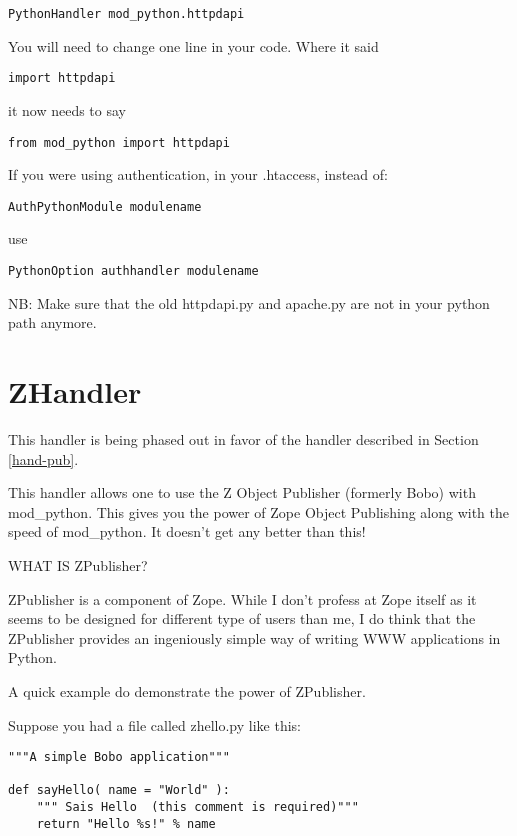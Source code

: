 \begin{verbatim}
PythonHandler mod_python.httpdapi
\end{verbatim}

You will need to change one line in your code. Where it said

\begin{verbatim}
import httpdapi
\end{verbatim}

it now needs to say

\begin{verbatim}
from mod_python import httpdapi
\end{verbatim}    

If you were using authentication, in your .htaccess, instead of:

\begin{verbatim}
AuthPythonModule modulename
\end{verbatim}    

use
\begin{verbatim}
PythonOption authhandler modulename
\end{verbatim}    

NB: Make sure that the old httpdapi.py and apache.py are not in your
python path anymore.

\section{ZHandler\label{hand-z}}

 This handler is being phased out in favor of the
 handler described in 
Section \ref{hand-pub}.

This handler allows one to use the Z Object Publisher (formerly Bobo)
with mod_python. This gives you the power of Zope Object Publishing
along with the speed of mod_python. It doesn't get any better than
this!

WHAT IS ZPublisher?

ZPublisher is a component of Zope. While I don't profess at Zope
itself as it seems to be designed for different type of users than me,
I do think that the ZPublisher provides an ingeniously simple way of
writing WWW applications in Python.

A quick example do demonstrate the power of ZPublisher.

Suppose you had a file called zhello.py like this:

\begin{verbatim}
"""A simple Bobo application"""

def sayHello( name = "World" ):
    """ Sais Hello  (this comment is required)"""
    return "Hello %s!" % name
\end{verbatim}

